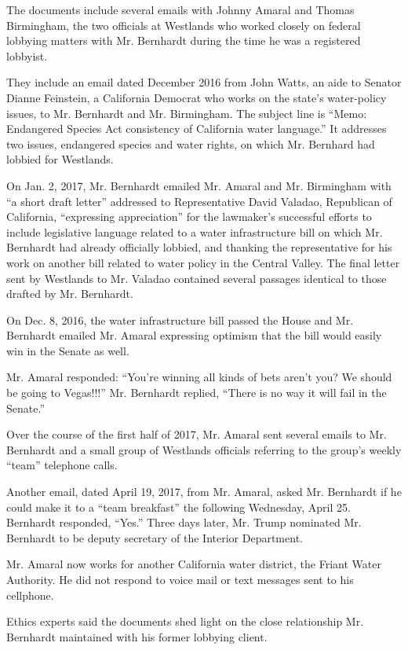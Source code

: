 The documents include several emails with Johnny Amaral and Thomas
Birmingham, the two officials at Westlands who worked closely on federal
lobbying matters with Mr. Bernhardt during the time he was a registered
lobbyist.

They include an email dated December 2016 from John Watts, an aide to
Senator Dianne Feinstein, a California Democrat who works on the state's
water-policy issues, to Mr. Bernhardt and Mr. Birmingham. The subject
line is ``Memo: Endangered Species Act consistency of California water
language.'' It addresses two issues, endangered species and water
rights, on which Mr. Bernhard had lobbied for Westlands.

On Jan. 2, 2017, Mr. Bernhardt emailed Mr. Amaral and Mr. Birmingham
with ``a short draft letter'' addressed to Representative David Valadao,
Republican of California, ``expressing appreciation'' for the lawmaker's
successful efforts to include legislative language related to a water
infrastructure bill on which Mr. Bernhardt had already officially
lobbied, and thanking the representative for his work on another bill
related to water policy in the Central Valley. The final letter sent by
Westlands to Mr. Valadao contained several passages identical to those
drafted by Mr. Bernhardt.

On Dec. 8, 2016, the water infrastructure bill passed the House and Mr.
Bernhardt emailed Mr. Amaral expressing optimism that the bill would
easily win in the Senate as well.

Mr. Amaral responded: ``You're winning all kinds of bets aren't you? We
should be going to Vegas!!!'' Mr. Bernhardt replied, ``There is no way
it will fail in the Senate.''

Over the course of the first half of 2017, Mr. Amaral sent several
emails to Mr. Bernhardt and a small group of Westlands officials
referring to the group's weekly ``team'' telephone calls.

Another email, dated April 19, 2017, from Mr. Amaral, asked Mr.
Bernhardt if he could make it to a ``team breakfast'' the following
Wednesday, April 25. Bernhardt responded, ``Yes.'' Three days later, Mr.
Trump nominated Mr. Bernhardt to be deputy secretary of the Interior
Department.

Mr. Amaral now works for another California water district, the Friant
Water Authority. He did not respond to voice mail or text messages sent
to his cellphone.

Ethics experts said the documents shed light on the close relationship
Mr. Bernhardt maintained with his former lobbying client.

